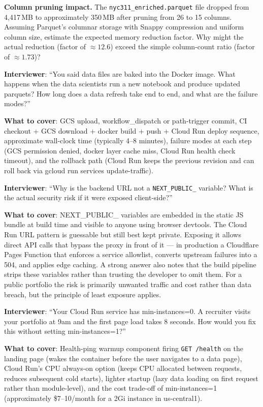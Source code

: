 \begin{challengebox}
\textbf{Column pruning impact.} The \texttt{nyc311\_enriched.parquet} file dropped from 4,417\,MB to approximately 350\,MB after pruning from 26 to 15 columns. Assuming Parquet's columnar storage with Snappy compression and uniform column size, estimate the expected memory reduction factor. Why might the actual reduction (factor of $\approx 12.6$) exceed the simple column-count ratio (factor of $\approx 1.73$)?
\end{challengebox}

\begin{interviewbox}
\textbf{Interviewer}: ``You said data files are baked into the Docker image. What happens when the data scientists run a new notebook and produce updated parquets? How long does a data refresh take end to end, and what are the failure modes?''

\textbf{What to cover}: GCS upload, workflow\_dispatch or path-trigger commit, CI checkout + GCS download + docker build + push + Cloud Run deploy sequence, approximate wall-clock time (typically 4--8 minutes), failure modes at each step (GCS permission denied, docker layer cache miss, Cloud Run health check timeout), and the rollback path (Cloud Run keeps the previous revision and can roll back via gcloud run services update-traffic).
\end{interviewbox}

\begin{interviewbox}
\textbf{Interviewer}: ``Why is the backend URL not a \texttt{NEXT\_PUBLIC\_} variable? What is the actual security risk if it were exposed client-side?''

\textbf{What to cover}: NEXT\_PUBLIC\_ variables are embedded in the static JS bundle at build time and visible to anyone using browser devtools. The Cloud Run URL pattern is guessable but still best kept private. Exposing it allows direct API calls that bypass the proxy in front of it --- in production a Cloudflare Pages Function that enforces a service allowlist, converts upstream failures into a 504, and applies edge caching. A strong answer also notes that the build pipeline strips these variables rather than trusting the developer to omit them. For a public portfolio the risk is primarily unwanted traffic and cost rather than data breach, but the principle of least exposure applies.
\end{interviewbox}

\begin{interviewbox}
\textbf{Interviewer}: ``Your Cloud Run service has min-instances=0. A recruiter visits your portfolio at 9am and the first page load takes 8 seconds. How would you fix this without setting min-instances=1?''

\textbf{What to cover}: Health-ping warmup component firing \texttt{GET /health} on the landing page (wakes the container before the user navigates to a data page), Cloud Run's CPU always-on option (keeps CPU allocated between requests, reduces subsequent cold starts), lighter startup (lazy data loading on first request rather than module-level), and the cost trade-off of min-instances=1 (approximately \$7--10/month for a 2Gi instance in us-central1).
\end{interviewbox}
